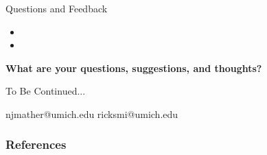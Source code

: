 \documentclass[t,aspectratio=169,11pt]{beamer}
\newenvironment{wideitemize}{\itemize\addtolength{\itemsep}{14pt}}{\enditemize}
\begin{document}
\begin{frame}{Questions and Feedback}

\begin{wideitemize}
    \item 
    \item<2-> 
    \begin{itemize}
        \item 
        \item 
    \end{itemize}
    \item<3-> 
    \vspace{12pt}
    \item<4-> \textbf{What are your questions, suggestions, and thoughts?} 
    

\end{wideitemize}

\end{frame}





\begin{frame}[c]
\centering
\Huge{\centerline{To Be Continued...}}
\normalsize njmather{\selectfont @}umich.edu
ricksmi{\selectfont @}umich.edu
\end{frame}



\begin{frame}
\frametitle{References}
\tiny

\end{frame}



\appendix
{}




\begin{frame}{}

\end{frame}
\end{document}
